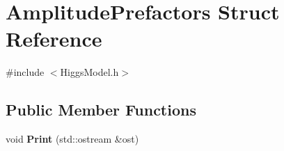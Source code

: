 \hypertarget{structAmplitudePrefactors}{\section{Amplitude\-Prefactors Struct Reference}
\label{structAmplitudePrefactors}
}


{\ttfamily \#include $<$Higgs\-Model.\-h$>$}

\subsection*{Public Member Functions}
\begin{DoxyCompactItemize}
\item 
\hypertarget{structAmplitudePrefactors_af5859a1f9403b3900e1a1a798ad071ea}{void {\bfseries Print} (std\-::ostream \&ost)}\label{structAmplitudePrefactors_af5859a1f9403b3900e1a1a798ad071ea}

\end{DoxyCompactItemize}
